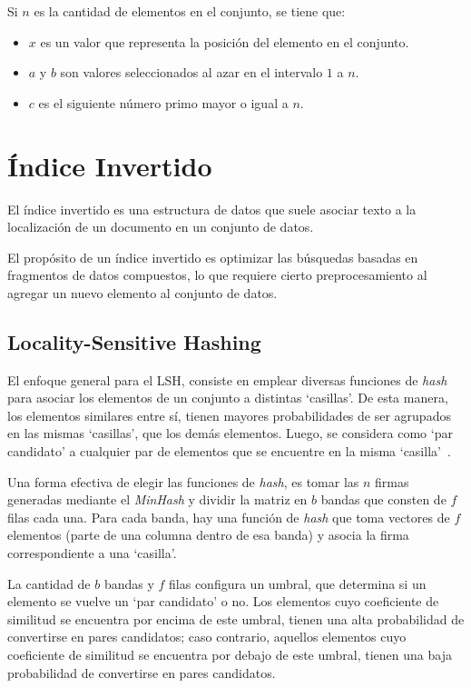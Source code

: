 Si $n$ es la cantidad de elementos en el conjunto, se tiene que:

\begin{itemize}
  \item $x$ es un valor que representa la posición del elemento en el conjunto.
  \item $a$ y $b$ son valores seleccionados al azar en el intervalo $1$ a $n$.
  \item $c$ es el siguiente número primo mayor o igual a $n$.
\end{itemize}

\section{Índice Invertido}
\label{sec:ind}
El índice invertido es una estructura de datos que suele asociar
texto a la localización de un documento en un conjunto de datos.

El propósito de un índice invertido es optimizar las búsquedas basadas en fragmentos de datos compuestos,
lo que requiere cierto preprocesamiento al agregar un nuevo elemento al conjunto de datos.

\newpage
\subsection{Locality-Sensitive Hashing}
El enfoque general para el \ac{LSH},
consiste en emplear diversas funciones de \textit{hash} para asociar
los elementos de un conjunto a distintas ‘casillas’.
De esta manera, los elementos similares entre sí,
tienen mayores probabilidades de ser agrupados en las mismas ‘casillas’,
que los demás elementos.
Luego, se considera como ‘par candidato’
a cualquier par de elementos que se encuentre en la misma ‘casilla’~\cite{Rajaraman:2011:MMD:2124405}.

Una forma efectiva de elegir las funciones de \textit{hash},
es tomar las $n$ firmas generadas mediante el \textit{MinHash}
y dividir la matriz en $b$ bandas que consten de $f$ filas cada una.
Para cada banda, hay una función de \textit{hash} que toma vectores de $f$ elementos
(parte de una columna dentro de esa banda)
y asocia la firma correspondiente a una ‘casilla’.


La cantidad de $b$ bandas y $f$ filas configura un umbral,
que determina si un elemento se vuelve un ‘par candidato’ o no.
Los elementos cuyo coeficiente de similitud se encuentra por encima de este umbral,
tienen una alta probabilidad de convertirse en pares candidatos;
caso contrario, aquellos elementos cuyo coeficiente de similitud se encuentra por debajo de este umbral,
tienen una baja probabilidad de convertirse en pares candidatos.

